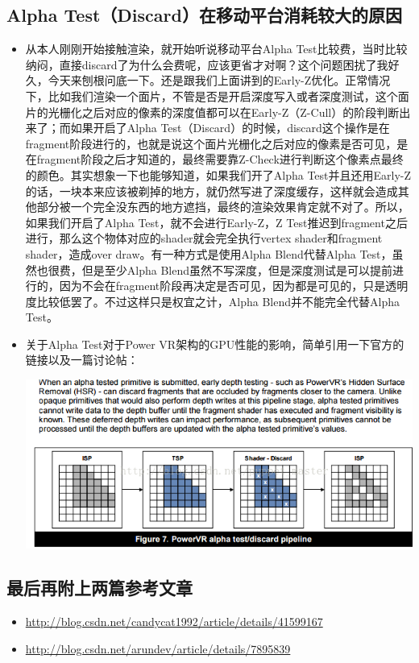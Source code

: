 \documentclass[9pt, b5paper]{article}
\begin{document}
\subsection{Alpha Test（Discard）在移动平台消耗较大的原因}
\label{sec-2-9}
\begin{itemize}
\item 从本人刚刚开始接触渲染，就开始听说移动平台Alpha Test比较费，当时比较纳闷，直接discard了为什么会费呢，应该更省才对啊？这个问题困扰了我好久，今天来刨根问底一下。还是跟我们上面讲到的Early-Z优化。正常情况下，比如我们渲染一个面片，不管是否是开启深度写入或者深度测试，这个面片的光栅化之后对应的像素的深度值都可以在Early-Z（Z-Cull）的阶段判断出来了；而如果开启了Alpha Test（Discard）的时候，discard这个操作是在fragment阶段进行的，也就是说这个面片光栅化之后对应的像素是否可见，是在fragment阶段之后才知道的，最终需要靠Z-Check进行判断这个像素点最终的颜色。其实想象一下也能够知道，如果我们开了Alpha Test并且还用Early-Z的话，一块本来应该被剃掉的地方，就仍然写进了深度缓存，这样就会造成其他部分被一个完全没东西的地方遮挡，最终的渲染效果肯定就不对了。所以，如果我们开启了Alpha Test，就不会进行Early-Z，Z Test推迟到fragment之后进行，那么这个物体对应的shader就会完全执行vertex shader和fragment shader，造成over draw。有一种方式是使用Alpha Blend代替Alpha Test，虽然也很费，但是至少Alpha Blend虽然不写深度，但是深度测试是可以提前进行的，因为不会在fragment阶段再决定是否可见，因为都是可见的，只是透明度比较低罢了。不过这样只是权宜之计，Alpha Blend并不能完全代替Alpha Test。
\item 关于Alpha Test对于Power VR架构的GPU性能的影响，简单引用一下官方的链接以及一篇讨论帖：

\includegraphics[width=.9\linewidth]{./pic/alphatest.png}
\end{itemize}
\subsection{最后再附上两篇参考文章}
\label{sec-2-10}
\begin{itemize}
\item \url{http://blog.csdn.net/candycat1992/article/details/41599167}
\item \url{http://blog.csdn.net/arundev/article/details/7895839}
\end{itemize}
\end{document}
